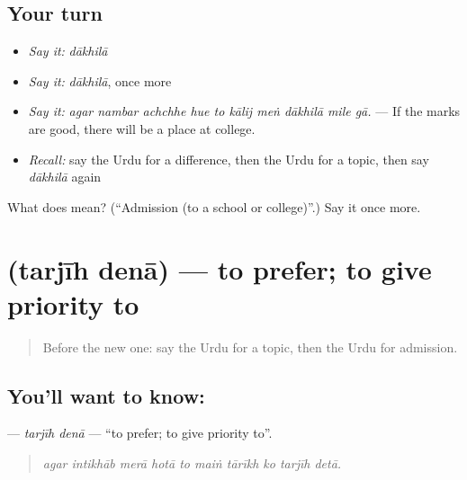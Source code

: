 \subsection*{Your turn}
\begin{itemize}
\raggedright
  \item \emph{Say it:} \emph{dākhilā}
  \item \emph{Say it:} \emph{dākhilā}, once more
  \item \emph{Say it:} \emph{agar nambar achchhe hue to kālij meṅ dākhilā mile gā.} — If the marks are good, there will be a place at college.
  \item \emph{Recall:} say the Urdu for a difference, then the Urdu for a topic, then say \emph{dākhilā} again
\end{itemize}

\begin{tcolorbox}[breakable,colback=teal!4,colframe=teal!35!black,title={Before you move on}]
What does  mean? (\textquotedblleft{}Admission (to a school or college)\textquotedblright{}.) Say it once more.
\end{tcolorbox}
\section[\texorpdfstring{\ur{ترجیح} \ur{دینا} (tarjīh denā)}{ترجیح دینا (tarjīh denā)}]{  (tarjīh denā) — to prefer; to give priority to}

\label{lesson:UR-C385-tarjih-dena}



\begin{quote}
Before the new one: say the Urdu for a topic, then the Urdu for admission.
\end{quote}

\subsection*{You'll want to know:  }
\textbf{ } — \emph{tarjīh denā} — \textquotedblleft{}to prefer; to give priority to\textquotedblright{}.

\begin{quote}
         
\end{quote}

\begin{quote}
\emph{agar intikhāb merā hotā to maiṅ tārīkh ko tarjīh detā.}
\end{quote}

